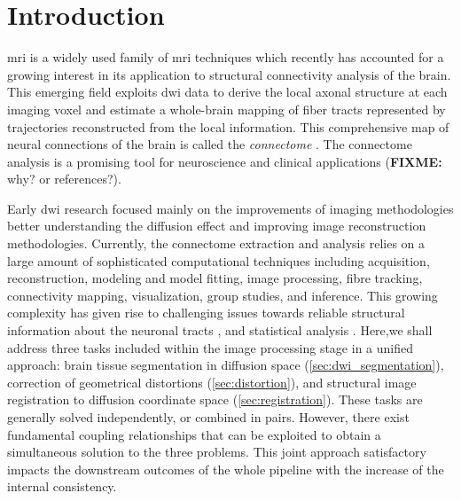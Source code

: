 \section{Introduction}
\label{sec:introduction}
% 
% 
% 
% 
%
 \gls{mri} is a widely used family
of \gls{mri} techniques \citep{sundgren_diffusion_2004} which recently 
has accounted for a growing interest in its application to structural 
connectivity analysis of the brain. This emerging field exploits
\gls{dwi} data to derive the local axonal structure at each imaging voxel 
\citep{basser_microstructural_2011} and estimate a whole-brain mapping of fiber 
tracts represented by trajectories reconstructed from the local information.
This comprehensive map of neural connections of the brain is called the 
\emph{connectome} \citep{hagmann_diffusion_2005,sporns_human_2005}. The connectome
analysis is a promising tool for neuroscience and clinical applications 
(\textbf{FIXME:} why? or references?).


Early \gls{dwi} research focused mainly on the improvements of imaging 
methodologies better understanding the diffusion effect and improving
image reconstruction methodologies. Currently, the connectome extraction 
and analysis relies on a large amount of sophisticated computational techniques
\citep{daducci_connectome_2012,hagmann_mr_2012} including acquisition,
reconstruction, modeling and model fitting, image processing, fibre tracking,
connectivity mapping, visualization, group studies, and inference. This 
growing complexity has given rise to challenging issues towards reliable 
structural information about the neuronal tracts \cite{johansen-berg_using_2009,
jones_white_2012,soares_hitchhikers_2013}, and statistical analysis 
\citep{meskaldji_comparing_????}. Here,we shall address three tasks included within 
the image processing stage in a unified approach: brain tissue segmentation in 
diffusion space (\autoref{sec:dwi_segmentation}), correction of geometrical 
distortions (\autoref{sec:distortion}), and structural image registration to 
diffusion coordinate space (\autoref{sec:registration}). These tasks are generally
solved independently, or combined in pairs. However, there exist fundamental 
coupling relationships that can be exploited to obtain a simultaneous solution to 
the three problems. This joint approach satisfactory impacts the downstream
outcomes of the whole pipeline with the increase of the internal consistency.

